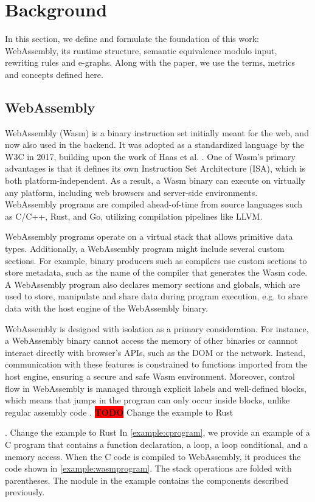 \documentclass[sigplan,screen]{acmart}
\newcommand*\badge[1]{ \colorbox{red}{\color{white}#1}}
\newcommand{\todo}[1]{%
\refstepcounter{todo}
\noindent\textbf{\badge{TODO}} {\color{red}#1}
\addcontentsline{td}{todo}
{\color{red}\thesection.\thetodo\xspace #1}}
\begin{document}
\section{Background}

In this section, we define and formulate the foundation of this work: WebAssembly, its runtime structure, semantic equivalence modulo input, rewriting rules and e-graphs.
Along with the paper, we use the terms, metrics and concepts defined here.

\subsection{WebAssembly}

WebAssembly (Wasm) is a binary instruction set initially  meant for the web, and now also used in the backend. 
It was adopted as a standardized language by the W3C in 2017, building upon the work of Haas et al. \cite{haas2017bringing}. One of Wasm's primary advantages is that it defines its own Instruction Set Architecture (ISA), which is both platform-independent. As a result, a Wasm binary can execute on virtually any platform, including web browsers and server-side environments. 
WebAssembly programs are compiled ahead-of-time from source languages such as C/C++, Rust, and Go, utilizing compilation pipelines like LLVM. 




WebAssembly programs operate on a virtual stack that allows primitive data types.
Additionally, a WebAssembly program might include several custom sections.
For example, binary producers such as compilers use custom sections to store metadata, such as the name of the compiler that generates the Wasm code.
A WebAssembly program also declares memory sections and globals, which are used to store, manipulate and share data during program execution, e.g. to share data with the host engine of the WebAssembly binary.

WebAssembly is designed with isolation as a primary consideration. For instance, a WebAssembly binary cannot access the memory of other binaries or cannnot interact directly with browser's APIs, such as the DOM or the network. Instead, communication with these features is constrained to functions imported from the host engine, ensuring a secure and safe Wasm environment.
Moreover, control flow in WebAssembly is managed through explicit labels and well-defined blocks, which means that jumps in the program can only occur inside blocks, unlike regular assembly code \cite{10.1145/3062341.3062363}. 
\todo{Change the example to Rust}
In \autoref{example:cprogram}, we provide an example of a C program that contains a function declaration, a loop, a loop conditional, and a memory access. When the C code is compiled to WebAssembly, it produces the code shown in \autoref{example:wasmprogram}. The stack operations are folded with parentheses.
The module in the example contains the components described previously.
\end{document}
